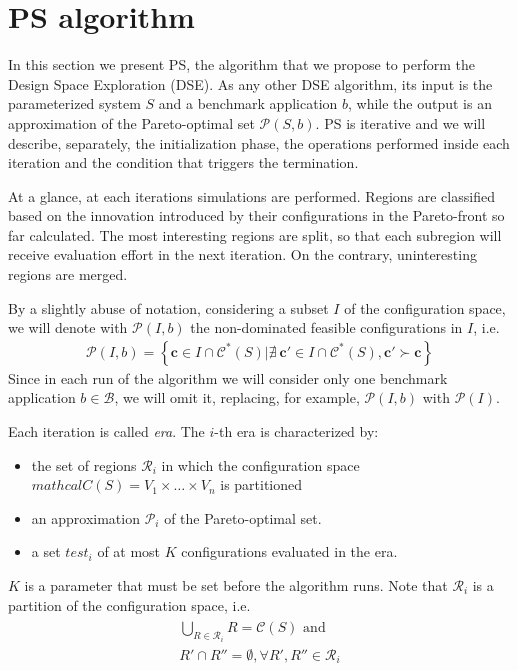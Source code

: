 
\section{PS algorithm}
In this section we present PS, the algorithm that we propose to perform the Design Space Exploration (DSE). As any other DSE algorithm, its input is the parameterized system $S$ and a benchmark application $b$, while the output is an approximation of the Pareto-optimal set $\mathcal{P}\left(S,b\right)$.   
PS is iterative and we will describe, separately, the initialization phase, the operations performed inside each iteration and the condition that triggers the termination.

At a glance, at each iterations simulations are performed. Regions are classified based on the innovation introduced by their configurations in the Pareto-front so far calculated. The most interesting regions are split, so that each subregion will receive evaluation effort in the next iteration. On the contrary, uninteresting regions are merged.

By a slightly abuse of notation, considering a subset $I$ of the configuration space, we will denote with $\mathcal{P}(I,b)$ the non-dominated feasible configurations in $I$, i.e.
	\begin{align}
		\mathcal{P}(I,b)=
		\left\{ \mathbf{c} \in I \cap \mathcal{C}^*(S) | \nexists \ \mathbf{c}' \in I \cap \mathcal{C}^*(S), \mathbf{c}' \succ \mathbf{c} \right\}
	\end{align}
Since in each run of the algorithm we will consider only one benchmark application $b\in\mathcal{B}$, we will omit it, replacing, for example, $\mathcal{P}(I,b)$ with  $\mathcal{P}(I)$.

Each iteration is called \emph{era}. The $i$-th era is characterized by: 
	\begin{itemize}
	\item the set of regions $\mathcal{R}_{i}$ in which the configuration space
	$mathcal{C}(S)=V_{1}\times\dots\times V_{n}$ is partitioned
	\item an approximation $\mathscr{P}_{i}$ of the Pareto-optimal set.
	\item a set $test_{i}$ of at most $K$ configurations evaluated
	in the era.
	\end{itemize}
$K$ is a parameter that must be set before the algorithm runs.
Note that $\mathcal{R}_{i}$ is a partition of the configuration space, i.e.
	\begin{align}\begin{array}{l}
		\bigcup_{R\in\mathcal{R}_i} R = \mathcal{C}(S) \mbox{ and}\\
		R' \cap R'' = \emptyset, \forall R',R'' \in \mathcal{R}_i
	\end{array}\end{align}

